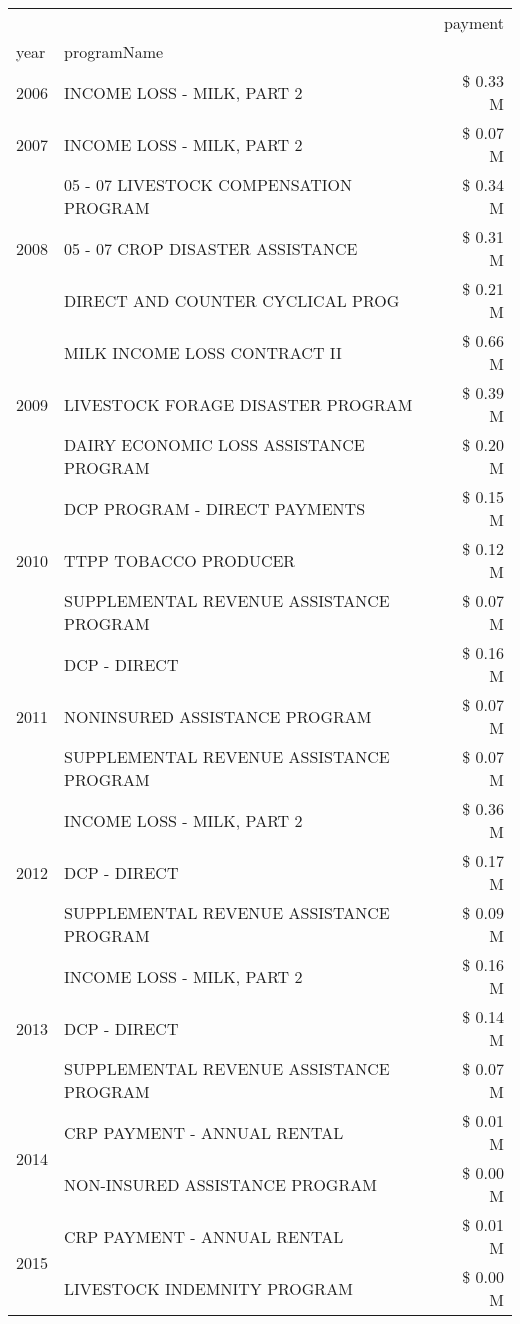 \begin{tabular}{llr}
\toprule
 &  & payment \\
year & programName &  \\
\midrule
2006 & INCOME LOSS - MILK, PART 2 & \$ 0.33 M \\
\cline{1-3}
2007 & INCOME LOSS - MILK, PART 2 & \$ 0.07 M \\
\cline{1-3}
\multirow[t]{3}{*}{2008} & 05 - 07 LIVESTOCK COMPENSATION PROGRAM & \$ 0.34 M \\
 & 05 - 07 CROP DISASTER ASSISTANCE & \$ 0.31 M \\
 & DIRECT AND COUNTER CYCLICAL PROG & \$ 0.21 M \\
\cline{1-3}
\multirow[t]{3}{*}{2009} & MILK INCOME LOSS CONTRACT II & \$ 0.66 M \\
 & LIVESTOCK FORAGE DISASTER  PROGRAM & \$ 0.39 M \\
 & DAIRY ECONOMIC LOSS ASSISTANCE PROGRAM & \$ 0.20 M \\
\cline{1-3}
\multirow[t]{3}{*}{2010} & DCP PROGRAM - DIRECT PAYMENTS & \$ 0.15 M \\
 & TTPP TOBACCO PRODUCER & \$ 0.12 M \\
 & SUPPLEMENTAL REVENUE ASSISTANCE PROGRAM & \$ 0.07 M \\
\cline{1-3}
\multirow[t]{3}{*}{2011} & DCP - DIRECT & \$ 0.16 M \\
 & NONINSURED ASSISTANCE PROGRAM & \$ 0.07 M \\
 & SUPPLEMENTAL REVENUE ASSISTANCE PROGRAM & \$ 0.07 M \\
\cline{1-3}
\multirow[t]{3}{*}{2012} & INCOME LOSS - MILK, PART 2 & \$ 0.36 M \\
 & DCP - DIRECT & \$ 0.17 M \\
 & SUPPLEMENTAL REVENUE ASSISTANCE PROGRAM & \$ 0.09 M \\
\cline{1-3}
\multirow[t]{3}{*}{2013} & INCOME LOSS - MILK, PART 2 & \$ 0.16 M \\
 & DCP - DIRECT & \$ 0.14 M \\
 & SUPPLEMENTAL REVENUE ASSISTANCE PROGRAM & \$ 0.07 M \\
\cline{1-3}
\multirow[t]{2}{*}{2014} & CRP PAYMENT - ANNUAL RENTAL & \$ 0.01 M \\
 & NON-INSURED ASSISTANCE PROGRAM & \$ 0.00 M \\
\cline{1-3}
\multirow[t]{2}{*}{2015} & CRP PAYMENT - ANNUAL RENTAL & \$ 0.01 M \\
 & LIVESTOCK INDEMNITY PROGRAM & \$ 0.00 M \\

\end{tabular}
